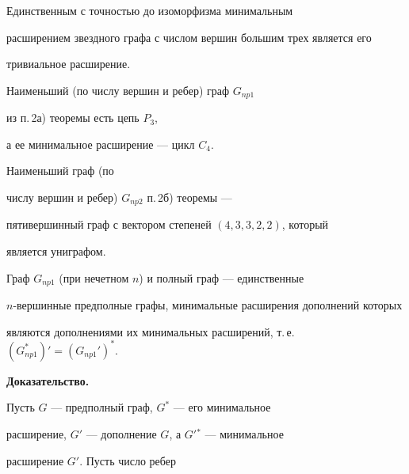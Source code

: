 \begin{cor}


Единственным с точностью до изоморфизма минимальным


расширением звездного графа с числом вершин большим трех является его


тривиальное расширение.


\end{cor}





\begin{cor}


Наименьший (по числу вершин и ребер) граф $G_{np1}$ 


из п.\,2а) теоремы есть цепь $P_3$,


а ее минимальное расширение --- цикл $C_4$.


\end{cor}





\begin{cor}


Наименьший граф (по


числу вершин и ребер) $G_{np2}$ п.\,2б) теоремы ---


пятивершинный граф с вектором степеней $(4,3,3,2,2)$, который


является униграфом.


\end{cor}





\begin{cor}


Граф $G_{np1}$ (при нечетном $n$) и полный граф --- единственные


$n$-вершинные предполные графы, минимальные расширения дополнений которых


являются дополнениями их минимальных расширений, т.\,е. $(G_{np1}^*)' =


(G_{np1}')^*$.


\end{cor}





{\bf Доказательство.}


Пусть $G$ --- предполный граф, $G^*$ --- его минимальное


расширение, $G'$ --- дополнение $G$, а $G'{}^*$ --- минимальное 


расширение $G'$. Пусть число ребер


